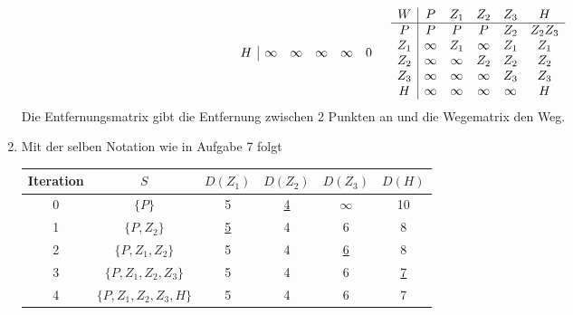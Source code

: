 \documentclass{article}
\begin{document}
\begin{enumerate}[label=(\alph*)]
\begin{align}
\begin{array}{c|ccccc}
				H & \infty & \infty & \infty & \infty & 0
			\end{array} \quad
			 \begin{array}{c|ccccc}
			 	W & P & Z_1 & Z_2 & Z_3 & H \\
			 	\hline
			 	P & P & P & P & Z_2 & Z_2Z_3 \\
			 	Z_1 & \infty & Z_1 & \infty & Z_1 & Z_1 \\
			 	Z_2 & \infty & \infty & Z_2 & Z_2 & Z_2 \\
			 	Z_3 & \infty & \infty & \infty & Z_3 & Z_3 \\
			 	H & \infty & \infty & \infty & \infty & H
			 \end{array}\notag
		\end{align}
		Die Entfernungsmatrix gibt die Entfernung zwischen 2 Punkten an und die Wegematrix den Weg.
		\item Mit der selben Notation wie in Aufgabe 7 folgt
		\begin{center}
			\begin{tabular}{c|c|cccc}
				Iteration & $S$ & $D(Z_1)$ & $D(Z_2)$ & $D(Z_3)$ & $D(H)$ \\
				\hline
				0 & $\{P\}$ & 5 & \underline{4} & $\infty$ & 10 \\
				1 & $\{P,Z_2\}$ & \underline{5} & 4 & 6 & 8 \\
				2 & $\{P,Z_1,Z_2\}$ & 5 & 4 & \underline{6} & 8 \\
				3 & $\{P,Z_1,Z_2,Z_3\}$ & 5 & 4 & 6 & \underline{7} \\
				4 & $\{P,Z_1,Z_2,Z_3,H\}$ & 5 & 4 & 6 & 7
			\end{tabular}
		\end{center}
	\end{enumerate}
	
\end{document}

